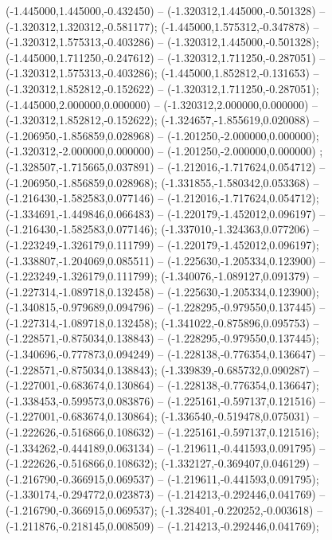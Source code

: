  (-1.445000,1.445000,-0.432450) -- (-1.320312,1.445000,-0.501328) -- (-1.320312,1.320312,-0.581177);
 (-1.445000,1.575312,-0.347878) -- (-1.320312,1.575313,-0.403286) -- (-1.320312,1.445000,-0.501328);
 (-1.445000,1.711250,-0.247612) -- (-1.320312,1.711250,-0.287051) -- (-1.320312,1.575313,-0.403286);
 (-1.445000,1.852812,-0.131653) -- (-1.320312,1.852812,-0.152622) -- (-1.320312,1.711250,-0.287051);
 (-1.445000,2.000000,0.000000) -- (-1.320312,2.000000,0.000000) -- (-1.320312,1.852812,-0.152622);
 (-1.324657,-1.855619,0.020088) -- (-1.206950,-1.856859,0.028968) -- (-1.201250,-2.000000,0.000000);
 (-1.320312,-2.000000,0.000000) -- (-1.201250,-2.000000,0.000000) ;
 (-1.328507,-1.715665,0.037891) -- (-1.212016,-1.717624,0.054712) -- (-1.206950,-1.856859,0.028968);
 (-1.331855,-1.580342,0.053368) -- (-1.216430,-1.582583,0.077146) -- (-1.212016,-1.717624,0.054712);
 (-1.334691,-1.449846,0.066483) -- (-1.220179,-1.452012,0.096197) -- (-1.216430,-1.582583,0.077146);
 (-1.337010,-1.324363,0.077206) -- (-1.223249,-1.326179,0.111799) -- (-1.220179,-1.452012,0.096197);
 (-1.338807,-1.204069,0.085511) -- (-1.225630,-1.205334,0.123900) -- (-1.223249,-1.326179,0.111799);
 (-1.340076,-1.089127,0.091379) -- (-1.227314,-1.089718,0.132458) -- (-1.225630,-1.205334,0.123900);
 (-1.340815,-0.979689,0.094796) -- (-1.228295,-0.979550,0.137445) -- (-1.227314,-1.089718,0.132458);
 (-1.341022,-0.875896,0.095753) -- (-1.228571,-0.875034,0.138843) -- (-1.228295,-0.979550,0.137445);
 (-1.340696,-0.777873,0.094249) -- (-1.228138,-0.776354,0.136647) -- (-1.228571,-0.875034,0.138843);
 (-1.339839,-0.685732,0.090287) -- (-1.227001,-0.683674,0.130864) -- (-1.228138,-0.776354,0.136647);
 (-1.338453,-0.599573,0.083876) -- (-1.225161,-0.597137,0.121516) -- (-1.227001,-0.683674,0.130864);
 (-1.336540,-0.519478,0.075031) -- (-1.222626,-0.516866,0.108632) -- (-1.225161,-0.597137,0.121516);
 (-1.334262,-0.444189,0.063134) -- (-1.219611,-0.441593,0.091795) -- (-1.222626,-0.516866,0.108632);
 (-1.332127,-0.369407,0.046129) -- (-1.216790,-0.366915,0.069537) -- (-1.219611,-0.441593,0.091795);
 (-1.330174,-0.294772,0.023873) -- (-1.214213,-0.292446,0.041769) -- (-1.216790,-0.366915,0.069537);
 (-1.328401,-0.220252,-0.003618) -- (-1.211876,-0.218145,0.008509) -- (-1.214213,-0.292446,0.041769);
